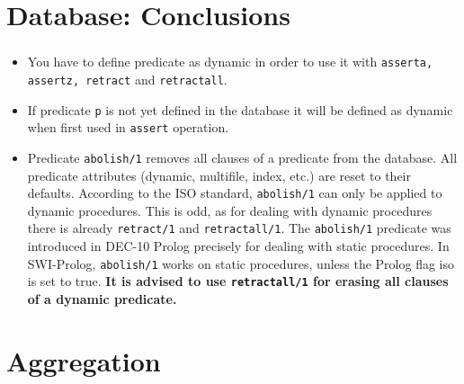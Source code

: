 

\section{Database: Conclusions}

\begin{frame}
	\frametitle{\insertsection}
	
	\begin{itemize}
		\item You have to define predicate as dynamic in order to use it with \texttt{asserta, assertz, retract} and \texttt{retractall}.
		\item If predicate \texttt{p} is not yet defined in the database it will be defined as dynamic when first used in \texttt{assert} operation.
		\item Predicate \texttt{abolish/1} removes all clauses of a predicate from the database. All predicate attributes (dynamic, multifile, index, etc.) are reset to their defaults. According to the ISO standard, \texttt{abolish/1} can only be applied to dynamic procedures. This is odd, as for dealing with dynamic procedures there is already \texttt{retract/1} and \texttt{retractall/1}. The \texttt{abolish/1} predicate was introduced in DEC-10 Prolog precisely for dealing with static procedures. In SWI-Prolog, \texttt{abolish/1} works on static procedures, unless the Prolog flag iso is set to true. \textbf{It is advised to use \texttt{retractall/1} for erasing all clauses of a dynamic predicate.}
	\end{itemize}
\end{frame}


\section{Aggregation}

